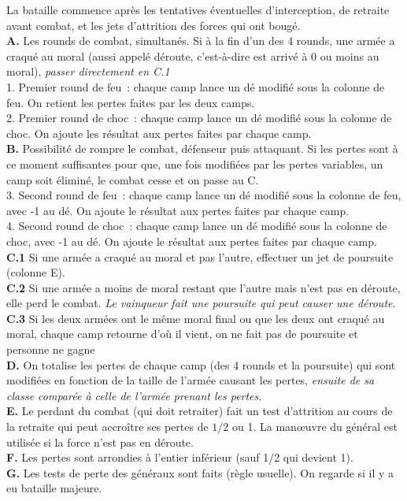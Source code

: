 \noindent
La bataille commence après les tentatives éventuelles d'interception, de
retraite avant combat, et les jets d'attrition des forces qui ont 
bougé. \\
{\bf A.} Les rounds de combat, simultanés. 
Si à la fin d'un des 4 rounds, une armée a craqué au moral (aussi appelé déroute, 
c'est-à-dire est arrivé à 0 ou moins au moral), \textit{passer directement en C.1} \\
1. Premier round de feu~: chaque camp lance un dé modifié sous la colonne de feu. On retient les
pertes faites par les deux camps. \\
2. Premier round de choc~: chaque camp lance un dé modifié sous la colonne de choc. On ajoute les
résultat aux pertes faites par chaque camp. \\
{\bf B.} Possibilité de rompre le combat, défenseur puis attaquant. Si les
pertes sont à ce moment suffisantes pour que, une fois modifiées par les pertes variables,
un camp soit éliminé, le combat cesse et on passe au C. \\
3. Second round de feu~: chaque camp lance un dé modifié sous la colonne de feu, avec -1 au dé. 
On ajoute le résultat aux pertes faites par chaque camp. \\
4. Second round de choc~: chaque camp lance un dé modifié sous la colonne de choc, avec -1 au dé. 
On ajoute le résultat aux pertes faites par chaque camp. \\
{\bf C.1} Si une armée a craqué au moral et pas l'autre, effectuer un jet de poursuite (colonne E). \\
{\bf C.2} Si une armée a moins de moral restant que l'autre mais n'est pas en déroute, elle perd le combat. 
\textit{Le vainqueur fait une poursuite qui peut causer une déroute}. \\
{\bf C.3} Si les deux armées ont le même moral final ou que les deux ont craqué au moral, 
chaque camp retourne d'où il vient, on ne fait pas de poursuite et personne ne gagne \\
{\bf D.} On totalise les pertes de chaque camp (des 4 rounds et la poursuite) qui sont modifiées 
en fonction de la taille de l'armée causant les pertes, 
\textit{ensuite de sa classe comparée à celle de
l'armée prenant les pertes}. \\
{\bf E.} Le perdant du combat (qui doit retraiter) fait un test d'attrition au cours de la retraite
qui peut accroître ses pertes de $1/2$ ou 1. La man{\oe}uvre du général est utilisée 
si la force n'est pas en déroute. \\
{\bf F.} Les pertes sont arrondies à l'entier inférieur (sauf 1/2 qui devient 1).\\
{\bf G.} Les tests de perte des généraux sont faits (règle usuelle). On regarde si
il y a eu bataille majeure. \\ 

